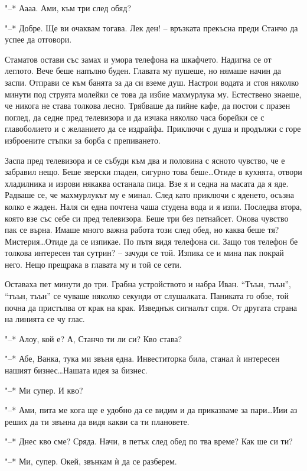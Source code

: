 \documentclass[ebook,openany,12pt]{memoir}
\begin{document}
"--* Аааа. Ами, към три след обяд?

"--* Добре. Ще ви очаквам тогава. Лек ден! – връзката прекъсна преди Станчо да успее да отговори.

Стаматов остави със замах и умора телефона на шкафчето. Надигна се от леглото. Вече беше напълно буден. Главата му пушеше, но нямаше начин да заспи. Отправи се към банята за да си вземе душ. Настрои водата и стоя няколко минути под струята молейки се това да избие махмурлука му. Естествено знаеше, че никога не става толкова лесно. Трябваше да пийне кафе, да постои с празен поглед, да седне пред телевизора и да изчака няколко часа борейки се с главоболието и с желанието да се издрайфа. Приключи с душа и продължи с горе изброените стъпки за борба с препиването.

Заспа пред телевизора и се събуди към два и половина с ясното чувство, че е забравил нещо. Беше зверски гладен, сигурно това бешe\ldots Отиде в кухнята, отвори хладилника и изрови някаква останала пица. Взе я и седна на масата да я яде. Радваше се, че махмурлукът му е минал. След като приключи с яденето, осъзна колко е жаден. Наля си една почтена чаша студена вода и я изпи. Последва втора, която взе със себе си пред телевизора. Беше три без петнайсет. Онова чувство пак се върна. Имаше много важна работа този след обед, но каква беше тя? Мистерия\ldots Отиде да се изпикае. По пътя видя телефона си. Защо тоя телефон бе толкова интересен тая сутрин? – зачуди се той. Изпика се и мина пак покрай него. Нещо прещрака в главата му и той се сети. 

Оставаха пет минути до три. Грабна устройството и набра Иван. ``Тъън, тъън'', ``тъън, тъън'' се чуваше няколко секунди от слушалката. Паниката го обзе, той почна да пристъпва от крак на крак. Изведнъж сигналът спря. От другата страна на линията се чу глас.

"--* Алоу, кой е? А, Станчо ти ли си? Кво става?

"--* Абе, Ванка, тука ми звъня една. Инвеститорка била, станал ѝ интересен нашият бизнес\ldots Нашата идея за бизнес.

"--* Ми супер. И кво?

"--* Ами, пита ме кога ще е удобно да се видим и да приказваме за пари\ldots Иии аз реших да ти звънна да видя какви са ти плановете.

"--* Днес кво сме? Сряда. Начи, в петък след обед по тва време? Как ше си ти?

"--* Ми, супер. Окей, звънкам ѝ да се разберем.
\end{document}
